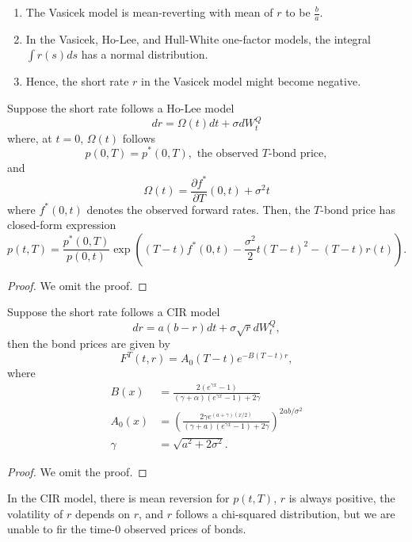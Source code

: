 \documentclass[11pt,fleqn]{book} %
\begin{document}
\begin{remark} \label{rmk:537}
\begin{enumerate}
\item The Vasicek model is mean-reverting with mean of \(r\) to be \(\frac b a\).
\item In the Vasicek, Ho-Lee, and Hull-White one-factor models, the integral \(\int r(s)ds\) has a normal distribution.
\item Hence, the short rate \(r\) in the Vasicek model might become negative.
\end{enumerate}
\end{remark}

\begin{corollary} \label{cor:538}
Suppose the short rate follows a Ho-Lee model
\[
dr = \Omega(t)dt + \sigma dW_t^Q
\]
where, at \(t = 0\), \(\Omega(t)\) follows
\[
p(0, T) = p^*(0, T), \text{ the observed \(T\)-bond price},
\]
and
\[
\Omega(t) = \frac{\partial f^*}{\partial T}(0, t) + \sigma^2t
\]
where \(f^*(0, t)\) denotes the observed forward rates. Then, the \(T\)-bond price has closed-form expression
\[
p(t, T) = \frac{p^*(0, T)}{p(0, t)}\exp\left((T - t)f^*(0, t) - \frac{\sigma^2}{2}t(T - t)^2 - (T - t)r(t)\right).
\]
\end{corollary}
\begin{proof}
    We omit the proof.
\end{proof}

\begin{corollary} \label{cor:539}
Suppose the short rate follows a CIR model
\[
dr = a(b - r)dt + \sigma\sqrt{r}dW_t^Q,
\]
then the bond prices are given by
\[
F^T(t, r) = A_0(T - t)e^{-B(T - t)r},
\]
where
\[
\begin{aligned}
B(x) &= \frac{2(e^{\gamma x} - 1)}{(\gamma + \alpha)(e^{\gamma x} - 1) + 2\gamma} \\
A_0(x) &= \left(\frac{2\gamma e^{(a + \gamma)(x / 2)}}{(\gamma + a)(e^{\gamma x} - 1) + 2\gamma}\right)^{2ab/\sigma^2} \\
\gamma &= \sqrt{a^2 + 2\sigma^2}.
\end{aligned}
\]
\end{corollary}
\begin{proof}
    We omit the proof.
\end{proof}

\begin{remark} \label{rmk:5310}
In the CIR model, there is mean reversion for \(p(t, T)\), \(r\) is always positive, the volatility of \(r\) depends on \(r\), and \(r\) follows a chi-squared distribution, but we are unable to fir the time-0 observed prices of bonds.
\end{remark}
\end{document}
